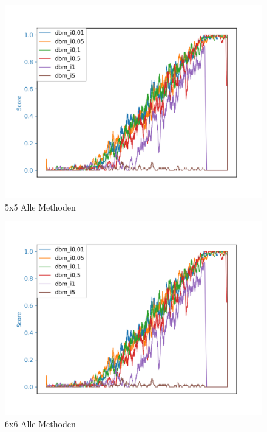 \begin{figure}[H]
\centering
\includegraphics[width=\textwidth]{Figures/dbm9_4x4_dbm_i0,01_dbm_i0,05_dbm_i0,1_dbm_i0,5_dbm_i1_dbm_i5.png}
\caption{5x5 Alle Methoden}
\label{all_5}
\end{figure}

\begin{figure}[H]
\centering
\includegraphics[width=\textwidth]{Figures/dbm9_4x4_dbm_i0,01_dbm_i0,05_dbm_i0,1_dbm_i0,5_dbm_i1_dbm_i5.png}
\caption{6x6 Alle Methoden}
\label{all_6}
\end{figure}

